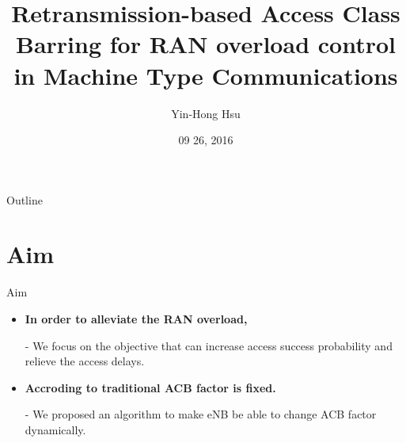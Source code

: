 \documentclass{beamer}
\title {
    Retransmission-based Access Class Barring for RAN overload control in Machine Type Communications
}
\author {
    Yin-Hong Hsu
}
\date {
    09 26, 2016
}
\begin{document}
\begin{frame}
    \titlepage
\end{frame}


\begin{frame}{Outline}
    \tableofcontentsgather
    \tableofcontents
\end{frame}

\section{Aim}

\begin{frame} {Aim} 
    \begin{itemize}
        \item \textbf{In order to alleviate the RAN overload,}
        \item [-]{We focus on the objective that can increase access success probability and relieve the access delays.}
        \item \textbf{Accroding to traditional ACB factor is fixed.}
        \item [-]{We proposed an algorithm to make eNB be able to change ACB factor dynamically.} 
    \end{itemize}
\end{frame}

\end{document}

